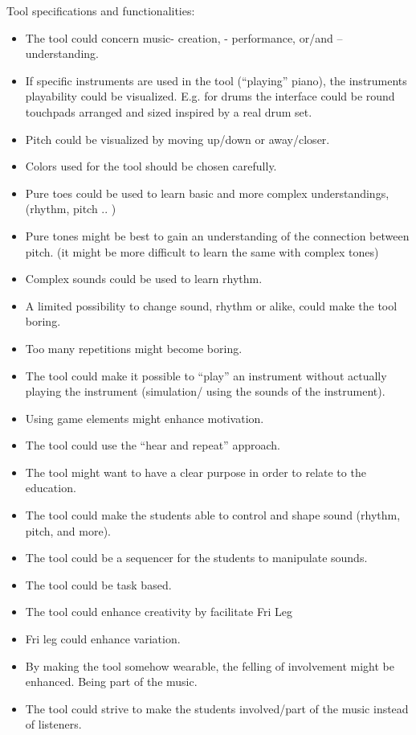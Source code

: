 Tool specifications and functionalities:
\begin{itemize}
\item	The tool could concern music- creation, - performance, or/and – understanding.
\item	If specific instruments are used in the tool (“playing” piano), the instruments playability could be visualized. E.g. for drums the interface could be round touchpads arranged and sized inspired by a real drum set. 
\item	Pitch could be visualized by moving up/down or away/closer. 
\item	Colors used for the tool should be chosen carefully. 
\item	Pure toes could be used to learn basic and more complex understandings, (rhythm, pitch .. ) 
\item	Pure tones might be best to gain an understanding of the connection between pitch. (it might be more difficult to learn the same with complex tones)
\item	Complex sounds could be used to learn rhythm. 
\item	A limited possibility to change sound, rhythm or alike, could make the tool boring. 
\item	Too many repetitions might become boring. 
\item	The tool could make it possible to “play” an instrument without actually playing the instrument (simulation/ using the sounds of the instrument). 
\item	Using game elements might enhance motivation.
\item	The tool could use the “hear and repeat” approach. 
\item	The tool might want to have a clear purpose in order to relate to the education. 
\item	The tool could make the students able to control and shape sound (rhythm, pitch, and more).
\item	The tool could be a sequencer for the students to manipulate sounds. 
\item	The tool could be task based. 
\item	The tool could enhance creativity by facilitate Fri Leg
\item	Fri leg could enhance variation. 
\item	By making the tool somehow wearable, the felling of involvement might be enhanced. Being part of the music.
\item	The tool could strive to make the students involved/part of the music instead of listeners.

\end{itemize}
